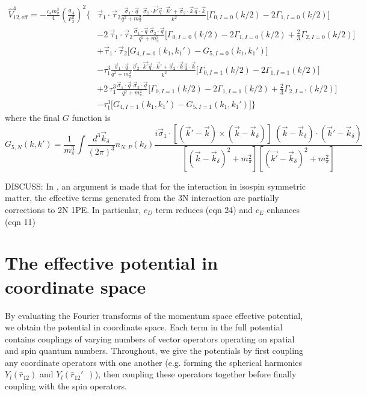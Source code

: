 \documentclass[%
 preprint,
 amsmath,amssymb,
 aps,
]{revtex4-1}
\newcommand{\veff}{\hat{V}_{12,\text{eff}}}
\newcommand{\rotphat}{\hat{r}_{12}\!\!\!\!'\,\,\,}
\newcommand{\taudot}{\vec{\tau}_1\cdot\vec{\tau}_2}
\newcommand{\Gam}[3]{\Gamma_{#1, I=#2}\left(#3\right)}
\begin{document}
 \begin{equation}\begin{split}
 \veff^4 = -\frac{c_4 m_\pi^3}{4} \left(\frac{g_A}{F_\pi^2}\right)^2
 \Bigg\{ &\taudot \frac{\vec{\sigma}_1 \cdot \vec{q}}{q^2+m_\pi^2}\frac{\vec{\sigma}_2\cdot\vec{k'}\vec{q}\cdot\vec{k}'+\vec{\sigma}_2\cdot\vec{k}\vec{q}\cdot\vec{k}}{k^2}\Big[\Gam{0}{0}{k/2}-2\Gam{1}{0}{k/2}\Big] \\
& - 2\,\taudot\frac{\vec{\sigma}_1 \cdot \vec{q}\;\vec{\sigma}_2 \cdot \vec{q}}{q^2+m_\pi^2}\Big[\Gam{0}{0}{k/2}-2\Gam{1}{0}{k/2} +\frac{2}{3}\Gam{2}{0}{k/2}\Big] \\
& + \taudot\Big[G_{4,I=0}(k_1,k_1')-G_{5,I=0}(k_1,k_1')\Big]\\
%
&-\tau_1^3 \frac{\vec{\sigma}_1 \cdot \vec{q}}{q^2+m_\pi^2}\frac{\vec{\sigma}_2\cdot\vec{k'}\vec{q}\cdot\vec{k}'+\vec{\sigma}_2\cdot\vec{k}\vec{q}\cdot\vec{k}}{k^2}\Big[\Gam{0}{1}{k/2}-2\Gam{1}{1}{k/2}\Big] \\
& + 2\,\tau_1^3\frac{\vec{\sigma}_1 \cdot \vec{q}\;\vec{\sigma}_2 \cdot \vec{q}}{q^2+m_\pi^2}\Big[\Gam{0}{1}{k/2}-2\Gam{1}{1}{k/2} +\frac{2}{3}\Gam{2}{!}{k/2}\Big] \\
& - \tau_1^3\Big[G_{4,I=1}(k_1,k_1')-G_{5,I=1}(k_1,k_1')\Big]
\Bigg\}
\end{split}
 \end{equation}
 where the final $G$ function is 
 \begin{equation}
 G_{5,N}(k,k')  = \frac{1}{m_\pi^3}\int\frac{d^3\vec{k}_\delta}{(2\pi)^3} n_{N,P}(k_\delta) \frac{i\vec{\sigma}_1\cdot\left[(\vec{k}'-\vec{k})\times(\vec{k}-\vec{k}_\delta)\right]\;(\vec{k}-\vec{k}_\delta)\cdot(\vec{k}'-\vec{k}_\delta) }{[(\vec{k}-\vec{k}_\delta)^2+m_\pi^2][(\vec{k'}-\vec{k}_\delta)^2+m_\pi^2]}
 \end{equation}

DISCUSS: In \cite{PhysRevC.81.024002}, an argument is made that for the interaction in isospin symmetric matter, the effective terms generated from the 3N interaction are partially corrections to 2N 1PE. In particular, $c_D$ term reduces (eqn 24) and $c_E$ enhances (eqn 11) 
 
\section{\label{sec:coord}The effective potential in coordinate space}

By evaluating the Fourier transforms of the momentum space effective potential, we obtain the potential in coordinate space. Each term in the full potential contains couplings of varying numbers of vector operators operating on spatial and spin quantum numbers. Throughout, we give the potentials by first coupling any coordinate operators with one another (e.g. forming the spherical harmonics $Y_l(\hat{r}_{12})$ and $Y_l(\rotphat)$), then coupling these operators together before finally coupling with the spin operators.
\end{document}
